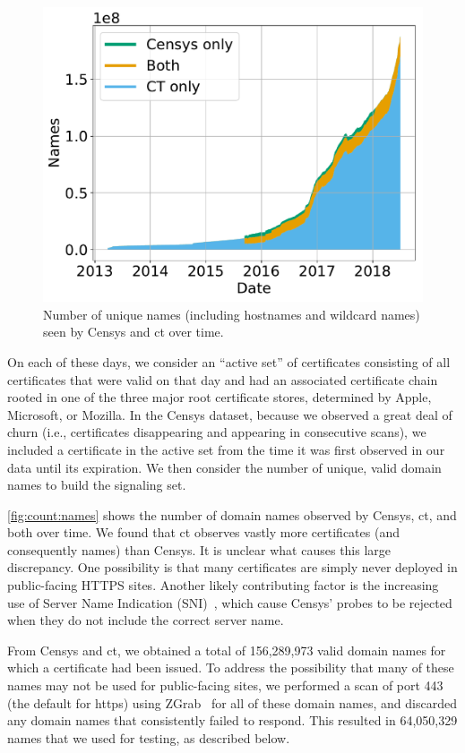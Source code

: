 \begin{figure}
  \centering
  \includegraphics[width=0.8\linewidth]{fig/name_count_valid}
  \caption{Number of unique names (including hostnames and wildcard names) seen
  by Censys and \ac{ct} over time.}
  \label{fig:count:names}
\end{figure}

On each of these days, we consider an ``active set'' of certificates consisting
of all certificates that were valid on that day and had an associated
certificate chain rooted in one of the three major root certificate stores,
determined by Apple, Microsoft, or Mozilla. In the Censys dataset, because we
observed a great deal of churn (i.e., certificates disappearing and appearing in
consecutive scans), we included a certificate in the active set from the time it
was first observed in our data until its expiration. We then consider the number
of unique, valid domain names to build the signaling set.

\autoref{fig:count:names} shows the number of domain names observed by Censys,
\ac{ct}, and both over time. We found that \ac{ct} observes vastly more
certificates (and consequently names) than Censys. It is unclear what causes
this large discrepancy. One possibility is that many certificates are simply
never deployed in public-facing HTTPS sites. Another likely contributing factor
is the increasing use of Server Name Indication (SNI)~\cite{rfc6066}, which
cause Censys' probes to be rejected when they do not include the correct server
name.

From Censys and \ac{ct}, we obtained a total of 156,289,973 valid domain names
for which a certificate had been issued. To address the possibility that many of
these names may not be used for public-facing sites, we performed a scan of port
443 (the default for \ac{https}) using ZGrab~\cite{durumeric2015search} for all
of these domain names, and discarded any domain names that consistently failed
to respond. This resulted in 64,050,329 names that we used for testing, as
described below.

